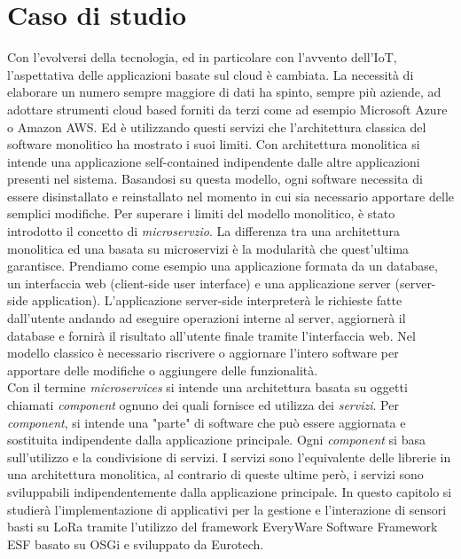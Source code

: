 \chapter{Caso di studio}
Con l'evolversi della tecnologia, ed in particolare con l'avvento dell'IoT,
l'aspettativa delle applicazioni basate sul cloud è cambiata. La necessità di
elaborare un numero sempre maggiore di dati ha spinto, sempre più aziende, ad
adottare strumenti cloud based forniti da terzi come ad esempio Microsoft Azure o Amazon
AWS.  Ed è utilizzando questi servizi  che l'architettura classica del
software monolitico ha mostrato i suoi limiti. Con architettura monolitica si
intende una applicazione self-contained indipendente dalle altre
applicazioni presenti nel sistema.  Basandosi su questa modello, ogni
software necessita di essere disinstallato e reinstallato nel momento in cui
sia necessario apportare delle semplici modifiche. Per superare i limiti del
modello monolitico, è stato introdotto il concetto di 
\emph{microservzio}.  La differenza tra una architettura monolitica ed una
basata su microservizi è la  modularità che quest'ultima garantisce.  Prendiamo
come esempio una applicazione formata da un database, un interfaccia web
(client-side user interface)  e una applicazione server (server-side
application).  L'applicazione server-side interpreterà le richieste fatte
dall'utente andando ad eseguire operazioni interne al server, aggiornerà il
database e fornirà il risultato all'utente finale tramite l'interfaccia web.
Nel modello classico  è necessario riscrivere o aggiornare l'intero 
software per apportare delle modifiche o aggiungere delle funzionalità.\\ 
Con il termine \emph{microservices}
si intende una architettura basata su oggetti chiamati \emph{component} ognuno
dei quali fornisce ed utilizza dei \emph{servizi}.  Per \textit{component}, si intende
una "parte" di software che può essere aggiornata e sostituita indipendente
dalla applicazione principale.  Ogni \emph{component} si basa sull'utilizzo e la
condivisione di servizi.  I servizi sono l'equivalente delle librerie in una
architettura monolitica, al contrario di queste ultime però, i servizi sono
sviluppabili indipendentemente dalla applicazione principale.
In questo capitolo si studierà
l'implementazione di applicativi per la gestione e l'interazione di sensori
basti su LoRa tramite l'utilizzo del framework EveryWare Software Framework ESF
basato su OSGi e sviluppato da Eurotech.
